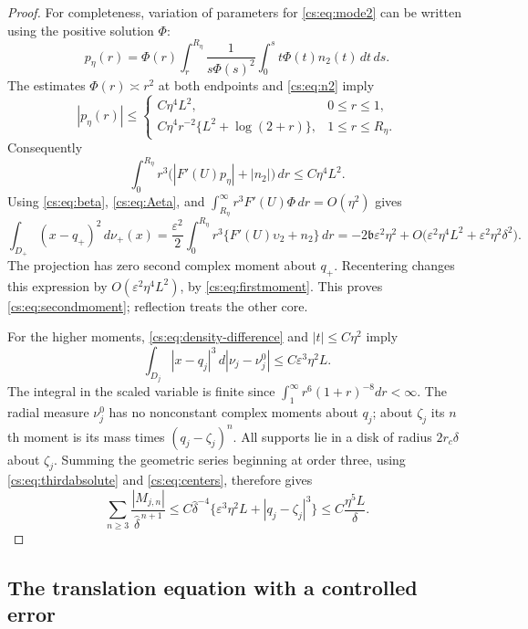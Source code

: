 \documentclass[11pt,reqno]{amsart}
\numberwithin{equation}{section}
\theoremstyle{definition}
\theoremstyle{remark}
\newcommand{\eps}{\varepsilon}
\begin{document}
\begin{proof}
For completeness, variation of parameters for \eqref{cs:eq:mode2} can
be written using the positive solution $\Phi$:
\[
 p_\eta(r)=
 \Phi(r)\int_r^{R_\eta}\frac1{s\Phi(s)^2}
                  \int_0^s t\Phi(t)n_2(t)\,dt\,ds .
\]
The estimates $\Phi(r)\asymp r^2$ at both endpoints and
\eqref{cs:eq:n2} imply
\[
 |p_\eta(r)|\le
 \begin{cases}
 C\eta^4L^2,&0\le r\le1,\\
 C\eta^4r^{-2}\{L^2+\log(2+r)\},&1\le r\le R_\eta.
 \end{cases}
\]
Consequently
\[
 \int_0^{R_\eta}r^3
       \bigl(|F'(U)p_\eta|+|n_2|\bigr)\,dr\le C\eta^4L^2.
\]
Using \eqref{cs:eq:beta}, \eqref{cs:eq:Aeta}, and
$\int_{R_\eta}^\infty r^3F'(U)\Phi\,dr=O(\eta^2)$ gives
\[
 \int_{D_+}(x-q_+)^2\,d\nu_+(x)
 =\frac{\eps^2}{2}\int_0^{R_\eta}r^3
                      \{F'(U)\upsilon_2+n_2\}\,dr
 =-2\mathfrak b\eps^2\eta^2
        +O\bigl(\eps^2\eta^4L^2+\eps^2\eta^2\delta^2\bigr).
\]
The projection has zero second complex moment about $q_+$.
Recentering changes this expression by
$O(\eps^2\eta^4L^2)$, by \eqref{cs:eq:firstmoment}. This proves
\eqref{cs:eq:secondmoment}; reflection treats the other core.

For the higher moments, \eqref{cs:eq:density-difference} and
$|t|\le C\eta^2$ imply
\begin{equation}\label{cs:eq:thirdabsolute}
 \int_{D_j}|x-q_j|^3\,d|\nu_j-\nu_j^0|
                       \le C\eps^3\eta^2L.
\end{equation}
The integral in the scaled variable is finite since
$\int_1^\infty r^6(1+r)^{-8}dr<\infty$.
The radial measure $\nu_j^0$ has no nonconstant complex moments
about $q_j$; about $\zeta_j$ its $n$th moment is its mass times
$(q_j-\zeta_j)^n$. All supports lie in a disk of radius
$2r_c\delta$ about $\zeta_j$. Summing the geometric series beginning
at order three, using \eqref{cs:eq:thirdabsolute} and
\eqref{cs:eq:centers}, therefore gives
\[
 \sum_{n\ge3}\frac{|M_{j,n}|}{\widehat\delta^{\,n+1}}
 \le C\widehat\delta^{-4}
       \{\eps^3\eta^2L+|q_j-\zeta_j|^3\}
 \le C\frac{\eta^5L}{\delta}.
\]
\end{proof}

\subsection{The translation equation with a controlled error}
\end{document}
